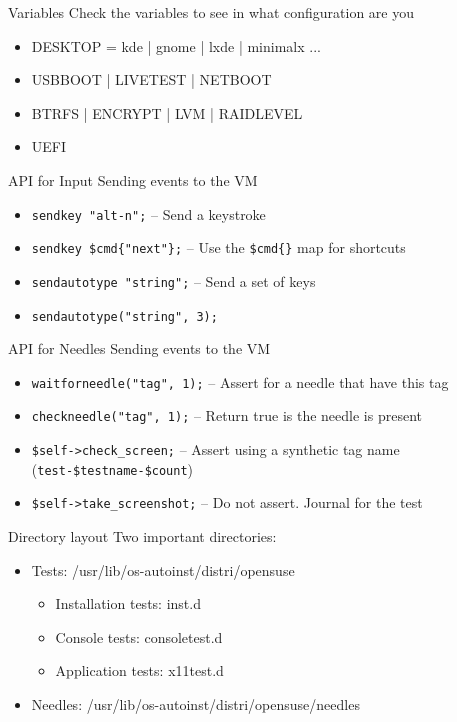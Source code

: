 \documentclass{beamer}
\begin{document}
%
%
\begin{frame}{Variables}
  Check the variables to see in what configuration are you
  \begin{itemize}
  \item DESKTOP = kde | gnome | lxde | minimalx ...
  \item USBBOOT | LIVETEST | NETBOOT
  \item BTRFS | ENCRYPT | LVM | RAIDLEVEL
  \item UEFI
  \end{itemize}
\end{frame}

\begin{frame}{API for Input}
  Sending events to the VM
  \begin{itemize}
  \item \texttt{sendkey "alt-n";} -- Send a keystroke
  \item \texttt{sendkey \$cmd\{"next"\};} -- Use the \texttt{\$cmd\{\}} map for shortcuts
  \item \texttt{sendautotype "string";} -- Send a set of keys
  \item \texttt{sendautotype("string", 3);}
  \end{itemize}
\end{frame}

\begin{frame}{API for Needles}
  Sending events to the VM
  \begin{itemize}
  \item \texttt{waitforneedle("tag", 1);} -- Assert for a needle that have this tag
  \item \texttt{checkneedle("tag", 1);} -- Return true is the needle is present
  \item \texttt{\$self->check\_screen;} -- Assert using a synthetic tag name (\texttt{test-\$testname-\$count})
  \item \texttt{\$self->take\_screenshot;} -- Do not assert. Journal for the test
  \end{itemize}
\end{frame}

%
%
\begin{frame}{Directory layout}
  Two important directories:
  \begin{itemize}
  \item Tests: /usr/lib/os-autoinst/distri/opensuse
    \begin{itemize}
    \item Installation tests: inst.d
    \item Console tests: consoletest.d
    \item Application tests: x11test.d
    \end{itemize}
  \item Needles: /usr/lib/os-autoinst/distri/opensuse/needles
  \end{itemize}
\end{frame}
\end{document}
